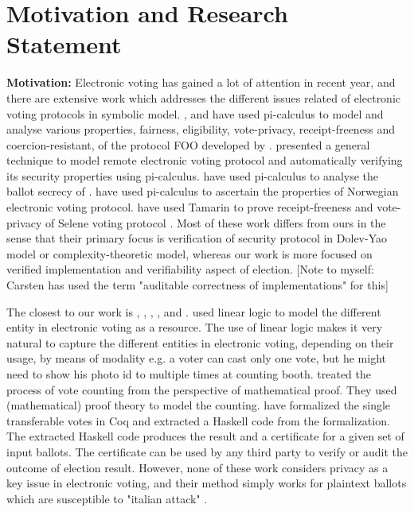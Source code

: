  \section{Motivation and Research Statement}
 \textbf{Motivation:}
 Electronic voting has gained a lot of attention in recent year,  and  there are extensive work which 
 addresses the different issues related of electronic voting protocols  in symbolic model.
 \cite{10.1007/978-3-540-31987-0_14}, and  \cite{Delaune2010} have used pi-calculus to model 
 and analyse various properties, fairness, eligibility, vote-privacy, receipt-freeness and coercion-resistant,  
 of the protocol FOO developed by \cite{10.1007/3-540-57220-1_66}.  \cite{Backes:2008:AVR:1380848.1381255}
 presented a general technique to model  remote electronic 
 voting protocol and automatically verifying  its security properties using pi-calculus. 
 \cite{5992139} have used pi-calculus to analyse the ballot secrecy of \cite{Helios:2016:HVS}.
 \cite{10.1007/978-3-642-28641-4_7} have used pi-calculus to ascertain the properties of 
 Norwegian electronic voting protocol.
 \cite{10.1007/978-3-319-68687-5_7} have used Tamarin  to prove receipt-freeness 
 and vote-privacy of Selene voting protocol \citep{Selene}.  Most of these work differs from ours
 in the sense that their primary focus is verification of security protocol in  
 Dolev-Yao model or  complexity-theoretic model, whereas our work is 
 more focused on verified implementation and  verifiability  aspect of election.
[Note to myself: Carsten has used the term "auditable correctness of implementations" for this]
 
 The closest to our work is \cite{DeYoung:2012:LLV}, \cite{Pattinson:2015:VCM}, \cite{Pattinson:2016:MSP},
 \cite{Verity:2017:FVI:3014812.3014845}, and \cite{Ghale:2017:FVS}.  \cite{DeYoung:2012:LLV} 
 used linear logic\citep{GIRARD19871} to model the different entity in electronic voting as a resource. 
 The use of linear logic makes it very natural to capture the different entities in electronic voting,  
 depending on their usage, by means of modality e.g. a voter can cast only one vote, but he might 
 need to show his photo id to multiple times at counting booth. \cite{Pattinson:2015:VCM} treated 
 the process of vote counting from
 the perspective of mathematical proof. They used (mathematical) proof theory to model the 
 counting. \cite{Ghale:2017:FVS} have formalized the single transferable votes in Coq and 
 extracted a Haskell code from the formalization. The extracted Haskell code produces the result 
 and a certificate for a given set of input ballots. The certificate can be used by any third party to verify 
 or audit the outcome of election result.  However, none of these work considers privacy as a key 
 issue in electronic voting, and their method simply works for plaintext ballots which are  susceptible to 
 "italian attack"  \citep{Otten}   \citep{Benaloh:2009:SSC}.
 
